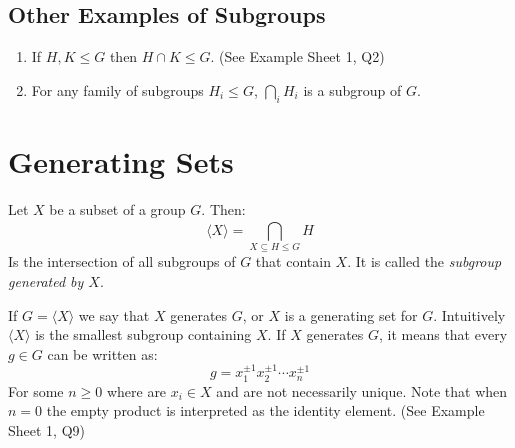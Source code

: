 \documentclass[../main.tex]{subfiles}
\begin{document}
\subsection{Other Examples of Subgroups}
\begin{example}
  \begin{enumerate}
    \item If $H, K \leq G$ then $H \cap K \leq G$. (See Example Sheet 1, Q2)
    \item For any family of subgroups $H_i \leq G$, $\bigcap_{i}^{} H_i$ is a subgroup of $G$.
  \end{enumerate}
\end{example}
\section{Generating Sets}
\begin{definition}
  Let $X$ be a subset of a group $G$. Then:
  \[
    \langle X \rangle = \bigcap_{X \subseteq H \leq G}^{} H
  \]
  Is the intersection of all subgroups of $G$ that contain $X$.
  It is called the \textit{subgroup generated by $X$}.
\end{definition}
If $G = \langle X \rangle$ we say that $X$ generates $G$, or $X$ is a generating set for $G$.
Intuitively $\langle X \rangle$ is the smallest subgroup containing $X$.
If $X$ generates $G$, it means that every $g \in G$ can be written as:
\[
  g = x^{\pm 1}_{1} x^{\pm 1}_{2} \cdots x^{\pm 1}_{n}
\]
For some $n \geq 0$ where are $x_i \in X$ and are not necessarily unique.
Note that when $n=0$ the empty product is interpreted as the identity element. (See Example Sheet 1, Q9)
\end{document}
